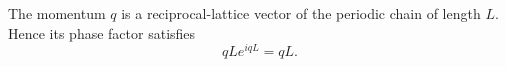 \documentclass{article}
\begin{document}
The momentum $q$ is a reciprocal-lattice vector of the periodic chain of
length $L$.  Hence its phase factor satisfies
\begin{equation}
q L e^{i q L} = q L .
\label{eq:reciprocal-periodicity}
\end{equation}
\end{document}
